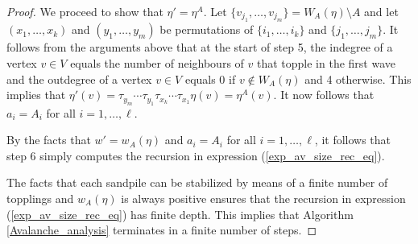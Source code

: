 \documentclass{article}
\begin{document}
\begin{proof}
    We proceed to show that $\eta' = \eta^A$. Let $\{v_{j_1}, \ldots, v_{j_m}\} = W_A(\eta) \setminus A$ and let $(x_1, \ldots, x_k)$ and $(y_1, \ldots, y_m)$ be permutations of $\{i_1, \ldots, i_k\}$ and $\{j_1, \ldots, j_m\}$. It follows from the arguments above that at the start of step 5, the indegree of a vertex $v \in V$ equals the number of neighbours of $v$ that topple in the first wave and the outdegree of a vertex $v \in V$ equals 0 if $v \notin W_A(\eta)$ and 4 otherwise. This implies that $\eta'(v) = \tau_{y_m} \cdots \tau_{y_1} \tau_{x_k} \cdots \tau_{x_1}\eta(v) = \eta^A(v)$. It now follows that $a_i = A_i$ for all $i = 1, \ldots, \ell$. 

    By the facts that $w' = w_A(\eta)$ and $a_i = A_i$ for all $i = 1, \ldots, \ell$, it follows that step 6 simply computes the recursion in expression (\ref{exp_av_size_rec_eq}).
    
    The facts that each sandpile can be stabilized by means of a finite number of topplings \citep{Dhar} and $w_A(\eta)$ is always positive ensures that the recursion in expression (\ref{exp_av_size_rec_eq}) has finite depth. This implies that Algorithm \ref{Avalanche_analysis} terminates in a finite number of steps.  
\end{proof}






\end{document}
